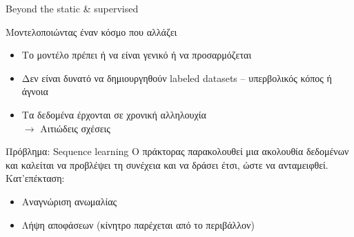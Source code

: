 \documentclass[11pt,center]{beamer}
\begin{document}
\begin{frame}{Beyond the static \& supervised \tiny{\cite{lecun,staticbottleneck}}}
  \begin{block}{Μοντελοποιώντας έναν κόσμο που αλλάζει}
    \pause
    \vspace{-0.5em}
    \begin{itemize}
      \item Το μοντέλο πρέπει ή να είναι γενικό ή να προσαρμόζεται
      \item Δεν είναι δυνατό να δημιουργηθούν labeled datasets -- υπερβολικός κόπος ή άγνοια
        \pause
      \item Τα δεδομένα έρχονται σε χρονική αλληλουχία \\ $\rightarrow$ Αιτιώδεις σχέσεις
    \end{itemize}
  \end{block}

  \pause
  \vspace{-0.5em}
  \begin{block}{Πρόβλημα: Sequence learning}
    Ο πράκτορας παρακολουθεί μια ακολουθία δεδομένων και καλείται να προβλέψει τη συνέχεια και να δράσει έτσι, ώστε να ανταμειφθεί. \\
    Κατ'επέκταση:
    \vspace{-0.3em}
    \begin{itemize}
      \item Αναγνώριση ανωμαλίας
      \item Λήψη αποφάσεων (κίνητρο παρέχεται από το περιβάλλον)
    \end{itemize}
  \end{block}
\end{frame}
\end{document}
